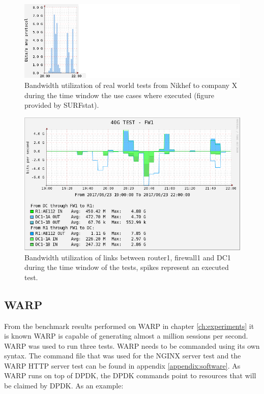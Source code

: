 \begin{figure}[H]
  \includegraphics[scale=0.8]{images/test-link-usage.png}
  \caption{Bandwidth utilization of real world tests from Nikhef to company X during the time window the use cases where executed (figure provided by SURFstat).}
  \label{fig:surftest}
\end{figure}

\begin{figure}[H]
  \includegraphics[scale=0.5]{images/real-ae112.png}
  \caption{Bandwidth utilization of links between router1, firewall1 and DC1 during the time window of the tests, spikes represent an executed test.}
  \label{fig:testrealusageae112}
\end{figure}



\subsection{WARP}
From the benchmark results performed on WARP in chapter \ref{ch:experiments} it is known WARP is capable of generating almost a million sessions per second. 
WARP was used to run three tests. WARP needs to be commanded using its own syntax. The command file that was used for the NGINX server test and the WARP HTTP server test can be found in appendix \ref{appendix:software}. As WARP runs on top of DPDK, the DPDK commands point to resources that will be claimed by DPDK. As an example:

